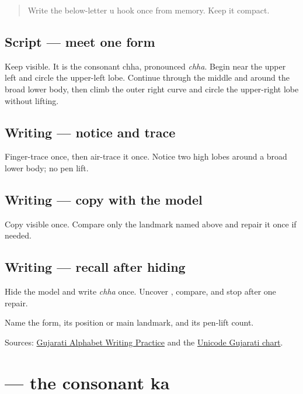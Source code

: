 \label{lesson:GU-W03-chha}



\begin{quote}
Write the below-letter u hook once from memory. Keep it compact.
\end{quote}

\subsection*{Script — meet one form}
Keep \textbf{} visible. It is the consonant chha, pronounced \emph{chha}. Begin near the upper left and circle the upper-left lobe. Continue through the middle and around the broad lower body, then climb the outer right curve and circle the upper-right lobe without lifting.

\subsection*{Writing — notice and trace}

Finger-trace \textbf{} once, then air-trace it once. Notice two high lobes around a broad lower body; no pen lift.

\subsection*{Writing — copy with the model}
Copy visible \textbf{} once. Compare only the landmark named above and repair it once if needed.

\subsection*{Writing — recall after hiding}
Hide the model and write \emph{chha} once. Uncover \textbf{}, compare, and stop after one repair.

\begin{tcolorbox}[breakable,colback=teal!4,colframe=teal!35!black,title={Before you move on}]
Name the form, its position or main landmark, and its pen-lift count.

Sources: \href{https://www.t30apps.com/gujarati-alphabet-writing/}{Gujarati Alphabet Writing Practice} and the \href{https://www.unicode.org/charts/PDF/U0A80.pdf}{Unicode Gujarati chart}.
\end{tcolorbox}
\section[\texorpdfstring{\gu{ક} (ka)}{ક (ka)}]{ — the consonant ka}

